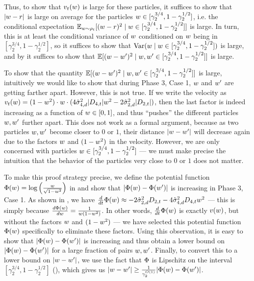 Thus, to show that $v_t(w)$ is large for these particles, it suffices to show that $|w - r|$ is large on average for the particles $w \in [\gamma_2^{3/4}, 1 - \gamma_2^{1/2}]$, i.e. the conditional expectation $\operatorname*{\mathbb{E}}_{w \sim \rho_t} [(w - r)^2 \mid w \in [\gamma_2^{3/4}, 1 - \gamma_2^{1/2}]]$ is large. In turn, this is at least the conditional variance of $w$ conditioned on $w$ being in $[\gamma_2^{3/4}, 1 - \gamma_2^{1/2}]$, so it suffices to show that $\operatorname*{Var}(w \mid w \in [\gamma_2^{3/4}, 1 - \gamma_2^{1/2}])$ is large, and by  it suffices to show that $\operatorname*{\mathbb{E}}[(w - w')^2 \mid w, w' \in [\gamma_2^{3/4}, 1 - \gamma_2^{1/2}]]$ is large.

To show that the quantity $\operatorname*{\mathbb{E}}[(w - w')^2 \mid w, w' \in [\gamma_2^{3/4}, 1 - \gamma_2^{1/2}]]$ is large, intuitively we would like to show that during Phase 3, Case 1, $w$ and $w'$ are getting farther apart. However, this is not true. If we write the velocity as $v_t(w) = (1 - w^2) \cdot w \cdot (4 \hat{\sigma}_{4, d}^2 |D_{4, t}| w^2 - 2 \hat{\sigma}_{2, d}^2 |D_{2, t}|)$, then the last factor is indeed increasing as a function of $w \in [0, 1]$, and thus ``pushes'' the different particles $w, w'$ further apart. This does not work as a formal argument, because as two particles $w, w'$ become closer to $0$ or $1$, their distance $|w - w'|$ will decrease again due to the factors $w$ and $(1 - w^2)$ in the velocity. However, we are only concerned with particles $w \in [\gamma_2^{3/4}, 1 - \gamma_2^{1/2}]$ --- we must make precise the intuition that the behavior of the particles very close to $0$ or $1$ does not matter.

To make this proof strategy precise, we define the potential function $\Phi(w) = \log \Big(\frac{w}{\sqrt{1 - w^2}}\Big)$ in  and show that $|\Phi(w) - \Phi(w')|$ is increasing in Phase 3, Case 1. As shown in , we have $\frac{d}{dt} \Phi(w) \approx -2 \hat{\sigma}_{2, d}^2 D_{2, t} - 4 \hat{\sigma}_{4, d}^2 D_{4, t} w^2$ --- this is simply because $\frac{d\Phi(w)}{dw} = \frac{1}{w (1 - w^2)}$. In other words, $\frac{d}{dt} \Phi(w)$ is exactly $v(w)$, but without the factors $w$ and $(1 - w^2)$ --- we have selected this potential function $\Phi(w)$ specifically to eliminate these factors. Using this observation, it is easy to show that $|\Phi(w) - \Phi(w')|$ is increasing and thus obtain a lower bound on $|\Phi(w) - \Phi(w')|$ for a large fraction of pairs $w, w'$. Finally, to convert this to a lower bound on $|w - w'|$, we use the fact that $\Phi$ is Lipschitz on the interval $[\gamma_2^{3/4}, 1 - \gamma_2^{1/2}]$ (), which gives us $|w - w'| \geq \frac{1}{\gamma_2^{O(1)}} |\Phi(w) - \Phi(w')|$. 

